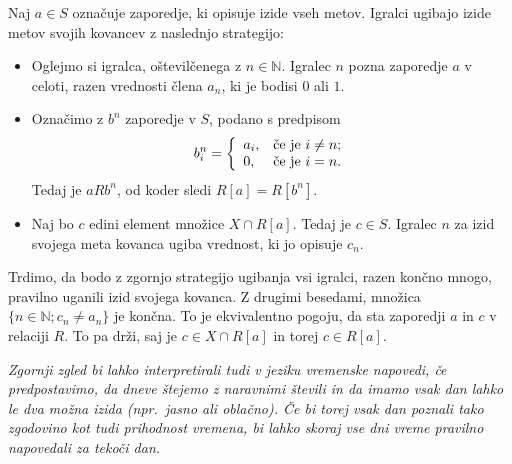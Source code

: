 \documentclass[11pt,paper=b5,DIV=13,headinclude,footinclude]{scrbook}
\begin{document}
\medskip
Naj $a\in S$ označuje zaporedje, ki opisuje izide vseh metov.
Igralci ugibajo izide metov svojih kovancev z naslednjo strategijo:
  \begin{itemize}
 \item Oglejmo si igralca, oštevilčenega z $n\in \mathbb{N}$.
  Igralec $n$ pozna zaporedje $a$ v celoti, razen vrednosti člena $a_n$, ki je bodisi $0$ ali $1$.
  \item Označimo z $b^n$ zaporedje v $S$, podano s predpisom
  $$b^n_i = \left\{
               \begin{array}{ll}
                 a_i, & \hbox{\v ce je $i\neq n$;} \\
                 0, & \hbox{\v ce je $i = n$.}
               \end{array}
             \right.
  $$
  Tedaj je $aRb^n$, od koder sledi $R[a] = R[b^n]$.
  \item Naj bo $c$ edini element množice $X\cap R[a]$.
Tedaj je $c\in S$. Igralec $n$ za izid svojega meta kovanca ugiba vrednost, ki jo opisuje $c_n$.
\end{itemize}

\medskip
Trdimo, da bodo z zgornjo strategijo ugibanja vsi igralci, razen končno mnogo, pravilno uganili izid svojega kovanca.
Z drugimi besedami, množica $\{n\in \mathbb{N}; c_n\neq a_n\}$ je končna.
To je ekvivalentno pogoju, da sta zaporedji $a$ in $c$ v relaciji $R$. To pa drži, saj je $c\in X\cap R[a]$ in torej $c\in R[a]$.

\bigskip
\bigskip
\emph{ Zgornji zgled bi lahko interpretirali tudi v jeziku vremenske napovedi, če predpostavimo, da dneve štejemo z naravnimi števili in
da imamo vsak dan lahko le dva možna izida (npr.~jasno ali oblačno). Če bi torej vsak dan poznali tako zgodovino kot
tudi prihodnost vremena, bi lahko skoraj vse dni vreme pravilno napovedali za tekoči dan.}



\end{document}
